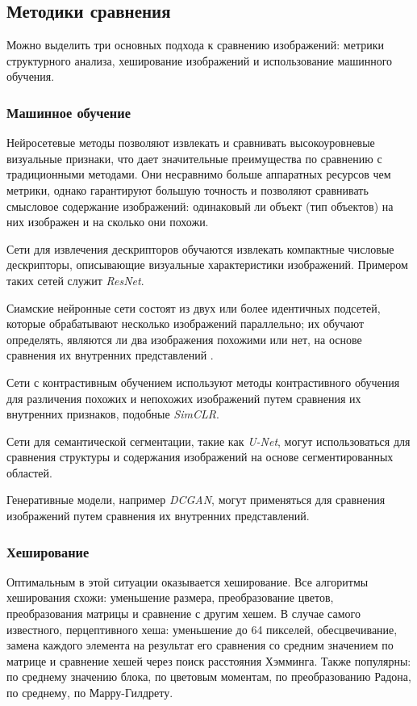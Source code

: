 \documentclass[variant=courcework]{bsuir}
\begin{document}
\subsection{Методики сравнения}
Можно выделить три основных подхода к сравнению изображений: метрики
структурного анализа, хеширование изображений и использование машинного
обучения.

\subsubsection{Машинное обучение}
Нейросетевые методы позволяют извлекать и сравнивать высокоуровневые визуальные
признаки, что дает значительные преимущества по сравнению с традиционными
методами. Они несравнимо больше аппаратных ресурсов чем метрики, однако
гарантируют большую точность и позволяют сравнивать смысловое содержание
изображений: одинаковый ли объект (тип объектов) на них изображен и на сколько
они похожи.

Сети для извлечения дескрипторов обучаются извлекать компактные числовые
дескрипторы, описывающие визуальные характеристики изображений. Примером таких
сетей служит \textit{ResNet}\cite{simonyan2015deep}.

Сиамские нейронные сети состоят из двух или более идентичных подсетей, которые
обрабатывают несколько изображений параллельно; их обучают определять, являются
ли два изображения похожими или нет, на основе сравнения их внутренних
представлений \cite{Koch2015SiameseNN}.

Сети с контрастивным обучением используют методы контрастивного обучения для
различения похожих и непохожих изображений путем сравнения их внутренних
признаков, подобные \textit{SimCLR}\cite{DBLP:journals/corr/abs-2002-05709}.

Сети для семантической сегментации, такие как
\textit{U-Net}\cite{10.1007/978-3-319-24574-4_28}, могут использоваться для
сравнения структуры и содержания изображений на основе сегментированных
областей.

Генеративные модели, например \textit{DCGAN}\cite{radford2015unsupervised},
могут применяться для сравнения изображений путем сравнения их внутренних
представлений.

\subsubsection{Хеширование}
Оптимальным в этой ситуации оказывается хеширование. Все алгоритмы хеширования
схожи: уменьшение размера, преобразование цветов, преобразования матрицы и
сравнение с другим хешем. В случае самого известного, перцептивного хеша:
уменьшение до 64 пикселей, обесцвечивание, замена каждого элемента на результат
его сравнения со средним значением по матрице и сравнение хешей через поиск
расстояния Хэмминга. Также популярны: по среднему значению блока, по цветовым
моментам, по преобразованию Радона, по среднему, по Марру-Гилдрету.
\end{document}
